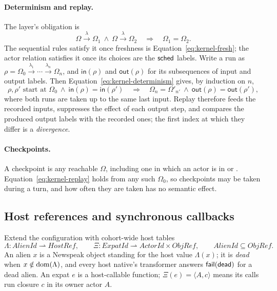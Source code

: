 \paragraph{Determinism and replay.}
The layer's obligation is
\begin{equation}\label{eq:kernel-determinism}
 \Omega\xrightarrow{\lambda}\Omega_1\ \land\
 \Omega\xrightarrow{\lambda}\Omega_2
 \quad\Longrightarrow\quad
 \Omega_1=\Omega_2.
\end{equation}
The sequential rules satisfy it once freshness is Equation~\eqref{eq:kernel-fresh};
the actor relation satisfies it once its choices are the $\mathsf{sched}$ labels.
Write a run as $\rho=\Omega_0\xrightarrow{\lambda_1}\cdots
\xrightarrow{\lambda_n}\Omega_n$, and $\mathsf{in}(\rho)$ and
$\mathsf{out}(\rho)$ for its subsequences of input and output labels.  Then
Equation~\eqref{eq:kernel-determinism} gives, by induction on $n$,
\begin{equation}\label{eq:kernel-replay}
 \rho,\rho'\text{ start at }\Omega_0\ \land\
 \mathsf{in}(\rho)=\mathsf{in}(\rho')
 \quad\Longrightarrow\quad
 \Omega_n=\Omega'_{n'}\ \land\ \mathsf{out}(\rho)=\mathsf{out}(\rho'),
\end{equation}
where both runs are taken up to the same last input.  Replay therefore feeds
the recorded inputs, suppresses the effect of each output step, and compares
the produced output labels with the recorded ones; the first index at which
they differ is a \emph{divergence}.

\paragraph{Checkpoints.}
A checkpoint is any reachable $\Omega$, including one in which an actor is in
\kw{runningTurn} or .  Equation~\eqref{eq:kernel-replay} holds
from any such $\Omega_0$, so checkpoints may be taken during a turn, and how
often they are taken has no semantic effect.

\subsection{Host references and synchronous callbacks}

Extend the configuration with cohort-wide host tables
\begin{equation}\label{eq:host-tables}
 \Lambda:\mathit{AlienId}\rightharpoonup\mathit{HostRef},
 \qquad
 \Xi:\mathit{ExpatId}\rightharpoonup\mathit{ActorId}\times\mathit{ObjRef},
 \qquad
 \mathit{AlienId}\subseteq\mathit{ObjRef}.
\end{equation}
An alien $x$ is a Newspeak object standing for the host value $\Lambda(x)$;
it is \emph{dead} when $x\notin\mathop{\mathrm{dom}}(\Lambda)$, and every host native's
transformer answers $\mathsf{fail}(\mathsf{dead})$ for a dead alien.  An expat $e$ is
a host-callable function; $\Xi(e)=\langle A,c\rangle$ means its calls run
closure $c$ in its owner actor $A$.

